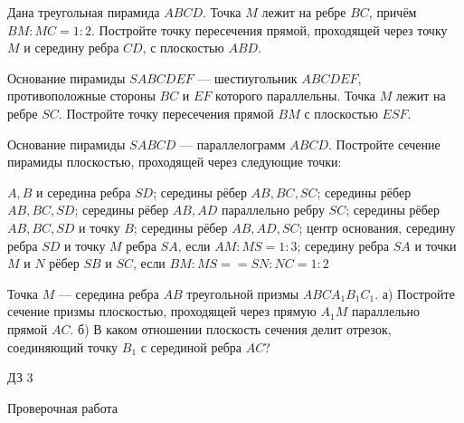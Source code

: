 \begin{homework}[number=2]
	\begin{listofex}
		\item Дана треугольная пирамида \(ABCD\). Точка \(M\) лежит на ребре \(BC\), причём \(BM:MC = 1:2\). Постройте точку пересечения прямой, проходящей через точку \(M\) и середину ребра \(CD\), с плоскостью \(ABD\).
		\item Основание пирамиды \(SABCDEF\) --- шестиугольник \(ABCDEF\), противоположные стороны \(BC\) и \(EF\) которого параллельны. Точка \(M\) лежит на ребре \(SC\). Постройте точку пересечения прямой \(BM\) с плоскостью \(ESF\).
		\item Основание пирамиды \(SABCD\) --- параллелограмм \(ABCD\). Постройте сечение пирамиды плоскостью, проходящей через следующие точки:
		\begin{itasks}[1]
			\task \(A, B\) и середина ребра \(SD\);
			\task середины рёбер \(AB, BC, SC\);
			\task середины рёбер \(AB, BC, SD\);
			\task середины рёбер \(AB, AD\) параллельно ребру \(SC\);
			\task середины рёбер \(AB, BC, SD\) и точку \(B\);
			\task середины рёбер \(AB, AD, SC\);
			\task центр основания, середину ребра \(SD\) и точку \(M\) ребра \(SA\), если \(AM:MS = 1:3\);
			\task середину ребра \(SA\) и точки \(M\) и \(N\) рёбер \(SB\) и \(SC\), если \(BM : MS = = SN :NC=1:2\)
		\end{itasks}
		\item Точка \(M\) — середина ребра \(AB\) треугольной призмы \(ABCA_1B_1C_1\). а) Постройте сечение призмы плоскостью, проходящей через прямую \(A_1M\) параллельно прямой \(AC\). б) В каком отношении плоскость сечения делит отрезок, соединяющий точку \(B_1\) с серединой ребра \(AC\)?
	\end{listofex}
\end{homework}

\begin{homework}[number=3]
	\begin{listofex}
		\item ДЗ 3
	\end{listofex}
\end{homework}

\begin{exam}
	\begin{listofex}
		\item Проверочная работа
	\end{listofex}
\end{exam}
